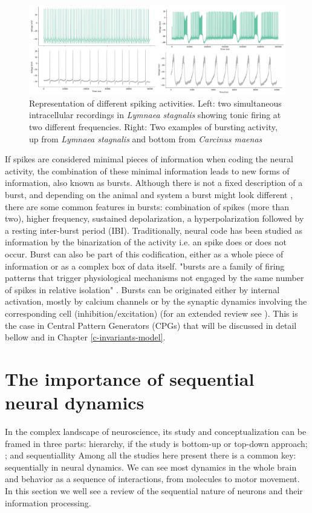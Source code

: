 \begin{figure}[htb!]
    \centering
    \includegraphics[width=\linewidth]{img/intro/spike_activity-types.pdf}
    \caption{Representation of different spiking activities. Left: two simultaneous intracellular recordings in \textit{Lymnaea stagnalis} showing tonic firing at two different frequencies. Right: Two examples of bursting activity, up from \textit{Lymnaea stagnalis} and bottom from \textit{Carcinus maenas}}
    \label{fig:spike_activity-types}
\end{figure}
If spikes are considered minimal pieces of information when coding the neural activity, the combination of these minimal information leads to new forms of information, also known as bursts. Although there is not a fixed description of a burst, and depending on the animal and system a burst might look different \cite{russell_bursting_1978,palmu_detection_2010,lundqvist_gamma_2016}, there are some common features in bursts: combination of spikes (more than two), higher frequency, sustained depolarization, a hyperpolarization followed by a resting inter-burst period (IBI). Traditionally, neural code has been studied as information by the binarization of the activity i.e. an spike does or does not occur. Burst can also be part of this codification, either as a whole piece of information or as a complex box of data itself. "bursts are a family of firing patterns that trigger physiological mechanisms not engaged by the same number of spikes in relative isolation" \cite{friedenberger_silences_2023}. Bursts can be originated either by internal activation, mostly by calcium channels or by the synaptic dynamics involving the corresponding cell (inhibition/excitation) (for an extended review see \cite{friedenberger_silences_2023}). This is the case in Central Pattern Generators (CPGs) \cite{Katz,steuer_central_2018} that will be discussed in detail bellow and in Chapter \ref{c-invariants-model}.

\section{The importance of sequential neural dynamics}
In the complex landscape of neuroscience, its study and conceptualization can be framed in three parts: hierarchy, if the study is bottom-up or top-down approach; ; and sequentiallity Among all the studies here present there is a common key: sequentially in neural dynamics. We can see most dynamics in the whole brain and behavior as a sequence of interactions, from molecules to motor movement. In this section we well see a review of the sequential nature of neurons and their information processing.

